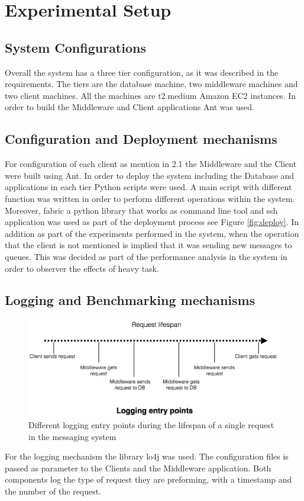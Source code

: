 \section{Experimental Setup}\label{sec:experimental-setup}

\subsection{System Configurations}\label{sec:system-configurations}
Overall the system has a three tier configuration, as it was described in the requirements. The tiers are the database machine, two middleware machines and two client machines. All the machines are t2.medium Amazon EC2 instances. In order to build the Middleware and Client applications Ant was used.
\subsection{Configuration and Deployment mechanisms}\label{sec:configuration-and-deployment-mechanisms}
For configuration of each client as mention in 2.1 the Middleware and the Client were built using Ant. In order to deploy the system including the Database and applications in each tier Python scripts were used. A main script with different function was written in order to perform different operations within the system.\\

 Moreover, fabric a python library that works as command line tool and ssh application was used as part of the deployment process see Figure \ref{fig:deploy}. In addition as part of the experiments performed in the system, when the operation that the client is not mentioned is implied that it was sending new messages to queues. This was decided as part of the performance analysis in the system in order to observer the effects of heavy task.
\subsection{Logging and Benchmarking mechanisms}\label{sec:logging-and-benchmarking-mechanisms}
\begin{figure}[h!]
	\centering
	\includegraphics[scale=0.3]{logging.png}
	\caption{Different logging entry points during the lifespan of a single request in the messaging system}
	\label{logging}
\end{figure}
 For the logging mechanism the library lo4j was used. The configuration files is passed as parameter to the Clients and the Middleware application. Both components log the type of request they are preforming, with a timestamp and the number of the request.\\
 
